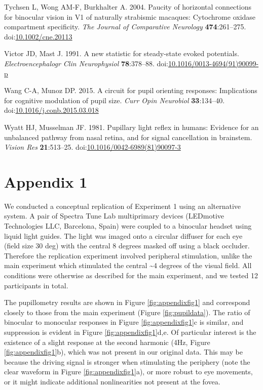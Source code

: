 \documentclass[
]{article}
\newlength{\cslhangindent}
\newlength{\cslentryspacingunit} %
\newenvironment{CSLReferences}[2] %
 {%
  \setlength{\parindent}{0pt}
  \ifodd #1
  \let\oldpar\par
  \def\par{\hangindent=\cslhangindent\oldpar}
  \fi
  \setlength{\parskip}{#2\cslentryspacingunit}
 }%
 {}
\newcommand{\beginsupplement}{\setcounter{table}{0}
\renewcommand{\thetable}{A\arabic{table}}
\setcounter{figure}{0}
\renewcommand{\thefigure}{A\arabic{figure}}}
\begin{document}
\begin{CSLReferences}{1}{0}
\leavevmode{}%
Tychsen L, Wong AM-F, Burkhalter A. 2004. Paucity of horizontal connections for binocular vision in V1 of naturally strabismic macaques: Cytochrome oxidase compartment specificity. \emph{The Journal of Comparative Neurology} \textbf{474}:261--275. doi:\href{https://doi.org/10.1002/cne.20113}{10.1002/cne.20113}

\leavevmode{}%
Victor JD, Mast J. 1991. A new statistic for steady-state evoked potentials. \emph{Electroencephalogr Clin Neurophysiol} \textbf{78}:378--88. doi:\href{https://doi.org/10.1016/0013-4694(91)90099-p}{10.1016/0013-4694(91)90099-p}

\leavevmode{}%
Wang C-A, Munoz DP. 2015. A circuit for pupil orienting responses: Implications for cognitive modulation of pupil size. \emph{Curr Opin Neurobiol} \textbf{33}:134--40. doi:\href{https://doi.org/10.1016/j.conb.2015.03.018}{10.1016/j.conb.2015.03.018}

\leavevmode{}%
Wyatt HJ, Musselman JF. 1981. Pupillary light reflex in humans: Evidence for an unbalanced pathway from nasal retina, and for signal cancellation in brainstem. \emph{Vision Res} \textbf{21}:513--25. doi:\href{https://doi.org/10.1016/0042-6989(81)90097-3}{10.1016/0042-6989(81)90097-3}

\end{CSLReferences}

\hypertarget{appendix-1}{%
\section{Appendix 1}\label{appendix-1}}

\beginsupplement

We conducted a conceptual replication of Experiment 1 using an alternative system. A pair of Spectra Tune Lab multiprimary devices (LEDmotive Technologies LLC, Barcelona, Spain) were coupled to a binocular headset using liquid light guides. The light was imaged onto a circular diffuser for each eye (field size 30 deg) with the central 8 degrees masked off using a black occluder. Therefore the replication experiment involved peripheral stimulation, unlike the main experiment which stimulated the central \textasciitilde4 degrees of the visual field. All conditions were otherwise as described for the main experiment, and we tested 12 participants in total.

The pupillometry results are shown in Figure \ref{fig:appendixfig1} and correspond closely to those from the main experiment (Figure \ref{fig:pupildata}). The ratio of binocular to monocular responses in Figure \ref{fig:appendixfig1}c is similar, and suppression is evident in Figure \ref{fig:appendixfig1}d,e. Of particular interest is the existence of a slight response at the second harmonic (4Hz, Figure \ref{fig:appendixfig1}b), which was not present in our original data. This may be because the driving signal is stronger when stimulating the periphery (note the clear waveform in Figure \ref{fig:appendixfig1}a), or more robust to eye movements, or it might indicate additional nonlinearities not present at the fovea.
\end{document}
